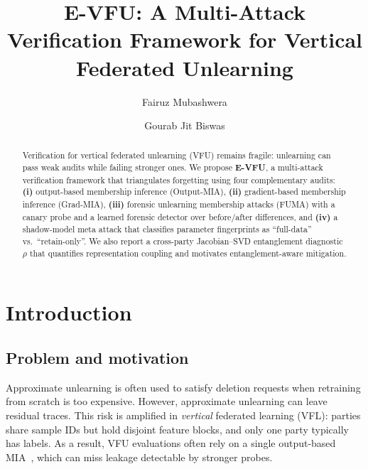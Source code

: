 \documentclass[sigconf,nonacm]{acmart}
\begin{document}
\sloppy
\setlength{\emergencystretch}{2em}

\title{E-VFU: A Multi-Attack Verification Framework for Vertical Federated Unlearning}

\author{Fairuz Mubashwera}

\author{Gourab Jit Biswas}

\begin{abstract}
Verification for vertical federated unlearning (VFU) remains fragile: unlearning can pass weak audits while failing stronger ones. We propose \textbf{E-VFU}, a multi-attack verification framework that triangulates forgetting using four complementary audits: \textbf{(i)} output-based membership inference (Output-MIA), \textbf{(ii)} gradient-based membership inference (Grad-MIA), \textbf{(iii)} forensic unlearning membership attacks (FUMA) with a canary probe and a learned forensic detector over before/after differences, and \textbf{(iv)} a shadow-model meta attack that classifies parameter fingerprints as ``full-data'' vs.\ ``retain-only''. We also report a cross-party Jacobian--SVD entanglement diagnostic $\rho$ that quantifies representation coupling and motivates entanglement-aware mitigation.
\end{abstract}

\maketitle

\section{Introduction}
\subsection{Problem and motivation}
Approximate unlearning is often used to satisfy deletion requests when retraining from scratch is too expensive. However, approximate unlearning can leave residual traces. This risk is amplified in \emph{vertical} federated learning (VFL): parties share sample IDs but hold disjoint feature blocks, and only one party typically has labels. As a result, VFU evaluations often rely on a single output-based MIA~\cite{varshney2025vfu}, which can miss leakage detectable by stronger probes.
\end{document}
